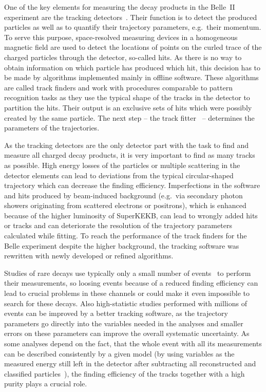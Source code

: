 
One of the key elements for measuring the decay products in the Belle~II experiment are the tracking detectors~\cite{tdr}. Their function is to detect the produced particles as well as to quantify their trajectory parameters, e.g.\ their momentum. To serve this purpose, space-resolved measuring devices in a homogeneous magnetic field are used to detect the locations of points on the curled trace of the charged particles through the detector, so-called hits. As there is no way to obtain information on which particle has produced which hit, this decision has to be made by algorithms implemented mainly in offline software. These algorithms are called track finders and work with procedures comparable to pattern recognition tasks as they use the typical shape of the tracks in the detector to partition the hits. Their output is an exclusive sets of hits which were possibly created by the same particle. The next step -- the track fitter~\cite{genfit} -- determines the parameters of the trajectories.

As the tracking detectors are the only detector part with the task to find and measure all charged decay products, it is very important to find as many tracks as possible. High energy losses of the particles or multiple scattering in the detector elements can lead to deviations from the typical circular-shaped trajectory which can decrease the finding efficiency. Imperfections in the software and hits produced by beam-induced background (e.g.\ via secondary photon showers originating from scattered electrons or positrons), which is enhanced because of the higher luminosity of SuperKEKB, can lead to wrongly added hits or tracks and can deteriorate the resolution of the trajectory parameters calculated while fitting. To reach the performance of the track finders for the Belle experiment despite the higher background, the tracking software was rewritten with newly developed or refined algorithms.

Studies of rare decays use typically only a small number of events~\cite{lutz} to perform their measurements, so loosing events because of a reduced finding efficiency can lead to crucial problems in these channels or could make it even impossible to search for these decays. Also high-statistic studies performed with millions of events can be improved by a better tracking software, as the trajectory parameters go directly into the variables needed in the analyses and smaller errors on these parameters can improve the overall systematic uncertainty. As some analyses depend on the fact, that the whole event with all its measurements can be described consistently by a given model (by using variables as the measured energy still left in the detector after subtracting all reconstructed and classified particles~\cite{christian_phd}), the finding efficiency of the tracks together with a high purity plays a crucial role.


